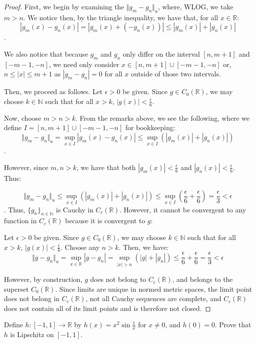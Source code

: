 \documentclass[10pt]{article}
\newenvironment{problem}[2][Problem]{\begin{trivlist}
\item[\hskip \labelsep {\bfseries #1}\hskip \labelsep {\bfseries #2.}]}{\end{trivlist}}
\begin{document}
\begin{proof}[Proof]
First, we begin by examining the $\Vert g_m - g_n \Vert_u$, where, WLOG, we take $m > n$. We notice then, by the triangle inequality, we have that, for all $x \in \mathbb{R}$:
$$|g_m(x) - g_n(x)| = |g_m(x) + (-g_n(x))| \leq |g_m(x)| + |g_n(x)|$$.

We also notice that because $g_m$ and $g_n$ only differ on the interval $[n,m+1]$ and $[-m-1, -n]$, we need only consider $x \in [n,m+1] \cup [-m-1,-n]$ or, $ n \leq |x| \leq m+1$  as $|g_m - g_n| = 0$ for all $x$ outside of those two intervals.


Then, we proceed as follows. Let $\epsilon > 0$ be given. Since $g \in C_0(\mathbb{R})$, we may choose $k \in \mathbb{N}$ such that for all $x > k$, $|g(x)| < \frac{\epsilon}{6}$.

Now, choose $m > n > k$. From the remarks above, we see the following, where we define $I =  [n,m+1] \cup [-m-1,-n]$ for bookkeeping:
$$ \Vert g_m - g_n \Vert_u = \sup_{x \in I} |g_m(x) - g_n(x)| \leq \sup_{x \in I} (|g_m(x)| + |g_n(x)|)$$.

 However, since $m,n > k$, we have that both $|g_m(x)| < \frac{\epsilon}{6}$ and $|g_n(x)| < \frac{\epsilon}{6}$. Thus:

$$ \Vert g_m - g_n \Vert_u \leq \sup_{x \in I} (|g_m(x)| + |g_n(x)|) \leq \sup_{x \in I} (\frac{\epsilon}{6} + \frac{\epsilon}{6}) = \frac{\epsilon}{3} < \epsilon $$. Thus,  $\{g_n\}_{n \in \mathbb{N}}$ is Cauchy in $C_c(\mathbb{R})$. However, it cannot be convergent to any function in $C_c(\mathbb{R})$ because it is convergent to $g$:

Let $\epsilon > 0$ be given. Since $g \in C_0(\mathbb{R})$, we may choose $k \in \mathbb{N}$ such that for all $x > k$, $|g(x)| < \frac{\epsilon}{6}$. Choose any $n > k$. Then, we have:
$$ \Vert g - g_n \Vert_u = \sup_{x \in \mathbb{R}} |g - g_n| = \sup_{ |x| > n } (|g|  + | g_n|) \leq \frac{\epsilon}{6} + \frac{\epsilon}{6} = \frac{\epsilon}{3} < \epsilon $$

However, by construction, $g$ does not belong to $C_c(\mathbb{R})$, and belongs to the superset $C_0(\mathbb{R})$. Since limits are unique in normed metric spaces, the limit point does not belong in $C_c(\mathbb{R})$, not all Cauchy sequences are complete, and $C_c(\mathbb{R})$ does not contain all of its limit points and is therefore not closed.
\end{proof}

\begin{problem}{1.4.3}
Define $h: [-1,1] \rightarrow \mathbb{R}$ by $h(x) = x^2 \sin \frac{1}{x}$ for $x \neq 0$, and $h(0)=0$. Prove that $h$ is Lipschitz on $[-1,1]$.
\end{problem}
\end{document}
